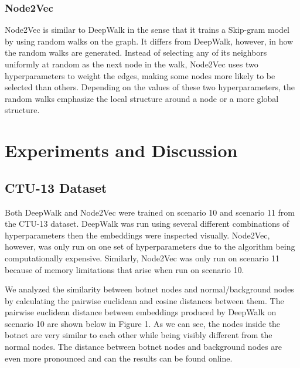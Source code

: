 \documentclass[10pt]{article}
\begin{document}
\begin{multicols}{2}
\subsubsection{Node2Vec}
Node2Vec \cite{Grover} is similar to DeepWalk in the sense that it trains a Skip-gram model by using random walks on the graph. It differs from DeepWalk, however, in how the random walks are generated. Instead of selecting any of its neighbors uniformly at random as the next node in the walk, Node2Vec uses two hyperparameters to weight the edges, making some nodes more likely to be selected than others. Depending on the values of these two hyperparameters, the random walks emphasize the local structure around a node or a more global structure. 

\section{Experiments and Discussion}
\subsection{CTU-13 Dataset}

Both DeepWalk and Node2Vec were trained on scenario 10 and scenario 11 from the CTU-13 dataset. DeepWalk was run using several different combinations of hyperparameters then the embeddings were inspected visually. Node2Vec, however, was only run on one set of hyperparameters due to the algorithm being computationally expensive. Similarly, Node2Vec was only run on scenario 11 because of memory limitations  that arise when run on scenario 10.

We analyzed the similarity between botnet nodes and normal/background nodes by calculating the pairwise euclidean and cosine distances between them. The pairwise euclidean distance between embeddings produced by DeepWalk on scenario 10  are shown below in Figure 1. As we can see, the nodes inside the botnet are very similar to each other while being visibly different from the normal nodes. The distance between botnet nodes and background nodes are even more pronounced and can the results can be found online.



\end{multicols}
\end{document}
